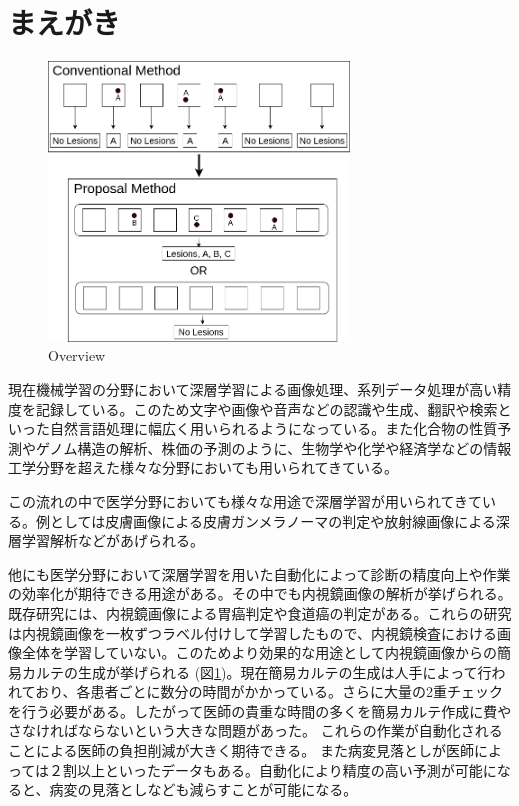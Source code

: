 \section{まえがき}

\begin{figure}[b]
    \begin{center}
        \includegraphics[width=80mm]{./fig/0.png}
        \caption{Overview}
        \label{fig:overview}
    \end{center}
\end{figure}

現在機械学習の分野において深層学習による画像処理\cite{CNN,AlexNet,VGG,ResNet}、系列データ処理\cite{RNN,GRU,LSTM,Transformer}が高い精度を記録している。このため文字や画像や音声などの認識\cite{DL_LVCSR,ImageNet}や生成\cite{GAN,VAE}、翻訳\cite{Transformer,Seq2Seq,effective_attention}や検索\cite{anxious_learning}といった自然言語処理に幅広く用いられるようになっている。また化合物の性質予測\cite{Chemistry1,Chemistry2}やゲノム構造の解析\cite{Genomics}、株価の予測\cite{stock_prediction}のように、生物学や化学や経済学などの情報工学分野を超えた様々な分野においても用いられてきている。

この流れの中で医学分野においても様々な用途で深層学習が用いられてきている。例としては皮膚画像による皮膚ガンメラノーマの判定\cite{skin_cancer_melanoma}や放射線画像による深層学習解析\cite{radiology}などがあげられる。

他にも医学分野において深層学習を用いた自動化によって診断の精度向上や作業の効率化が期待できる用途がある。その中でも内視鏡画像の解析が挙げられる。既存研究には、内視鏡画像による胃癌判定\cite{stomach_cancer}や食道癌\cite{esophageal_cancer}の判定がある。これらの研究は内視鏡画像を一枚ずつラベル付けして学習したもので、内視鏡検査における画像全体を学習していない。このためより効果的な用途として内視鏡画像からの簡易カルテの生成が挙げられる (図\ref{fig:overview})。現在簡易カルテの生成は人手によって行われており、各患者ごとに数分の時間がかかっている。さらに大量の2重チェックを行う必要がある。したがって医師の貴重な時間の多くを簡易カルテ作成に費やさなければならないという大きな問題があった。
これらの作業が自動化されることによる医師の負担削減が大きく期待できる。
また病変見落としが医師によっては２割以上といったデータ\cite{medical_problem2}もある。自動化により精度の高い予測が可能になると、病変の見落としなども減らすことが可能になる。

